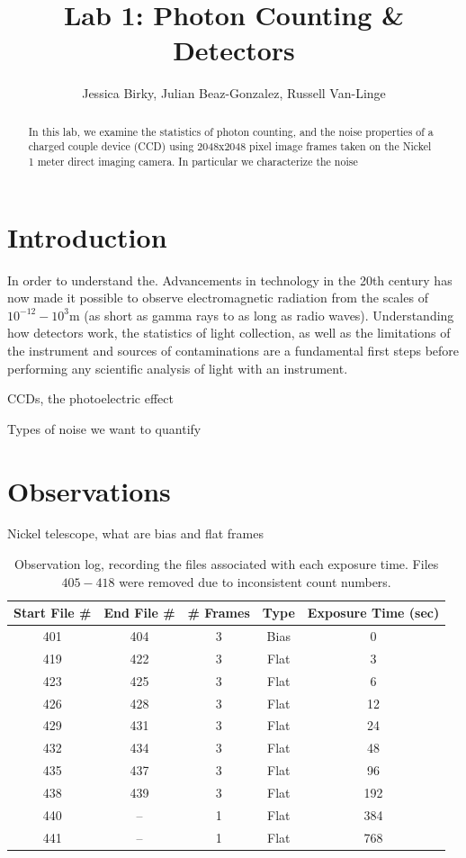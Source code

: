 \documentclass[preprint]{aastex62}
\begin{document}
\title{\sc Lab 1: Photon Counting \& Detectors}
\author{Jessica Birky, Julian Beaz-Gonzalez, Russell Van-Linge}


\begin{abstract}
In this lab, we examine the statistics of photon counting, and the noise properties of a charged couple device (CCD) using 2048x2048 pixel image frames taken on the Nickel 1 meter direct imaging camera. In particular we characterize the noise 

\end{abstract}
\bigskip

\section{Introduction} 
In order to understand the. Advancements in technology in the 20th century has now made it possible to observe electromagnetic radiation from the scales of $10^{-12}-10^3$m (as short as gamma rays to as long as radio waves). Understanding how detectors work, the statistics of light collection, as well as the limitations of the instrument and sources of contaminations are a fundamental first steps before performing any scientific analysis of light with an instrument.

CCDs, the photoelectric effect

Types of noise we want to quantify

\section{Observations}
Nickel telescope, what are bias and flat frames

\begin{table}[ht]
\centering
\begin{tabular}{|c|c|c|c|c|}
    \hline
    Start File \# & End File \# & \# Frames & Type  & Exposure Time (sec) \\
    \hline
    \hline
    401 & 404 & 3 & Bias & 0  \\
    419 & 422 & 3 & Flat & 3 \\
    423 & 425 & 3 & Flat & 6 \\
    426 & 428 & 3 & Flat & 12 \\
    429 & 431 & 3 & Flat & 24 \\
    432 & 434 & 3 & Flat & 48 \\
    435 & 437 & 3 & Flat & 96 \\
    438 & 439 & 3 & Flat & 192 \\
    440 & --  & 1 & Flat & 384 \\
    441 & --  & 1 & Flat & 768 \\
    \hline
\end{tabular}
\caption{Observation log, recording the files associated with each exposure time. Files $405-418$ were removed due to inconsistent count numbers.}
\end{table}
\end{document}
